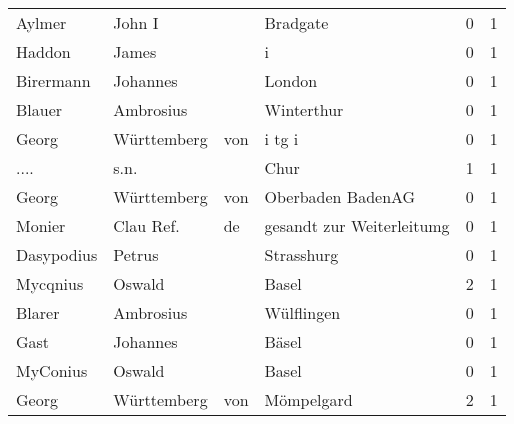 \documentclass[10pt,a4paper,landscape]{article}
\begin{document}
\begin{longtable}{llllrr}
                   Aylmer &                             John I &             &                                    Bradgate &          0 &         1 \\
                   Haddon &                              James &             &                                           i &          0 &         1 \\
                Birermann &                           Johannes &             &                                      London &          0 &         1 \\
                   Blauer &                          Ambrosius &             &                                  Winterthur &          0 &         1 \\
                    Georg &                        Württemberg &         von &                                      i tg i &          0 &         1 \\
                     .... &                               s.n. &             &                                        Chur &          1 &         1 \\
                    Georg &                        Württemberg &         von &                           Oberbaden BadenAG &          0 &         1 \\
                   Monier &                          Clau Ref. &          de &                   gesandt zur Weiterleitumg &          0 &         1 \\
               Dasypodius &                             Petrus &             &                                  Strasshurg &          0 &         1 \\
                 Mycqnius &                             Oswald &             &                                       Basel &          2 &         1 \\
                   Blarer &                          Ambrosius &             &                                  Wülflingen &          0 &         1 \\
                     Gast &                           Johannes &             &                                       Bäsel &          0 &         1 \\
                 MyConius &                             Oswald &             &                                       Basel &          0 &         1 \\
                    Georg &                        Württemberg &         von &                                  Mömpelgard &          2 &         1 \\

\end{longtable}
\end{document}
